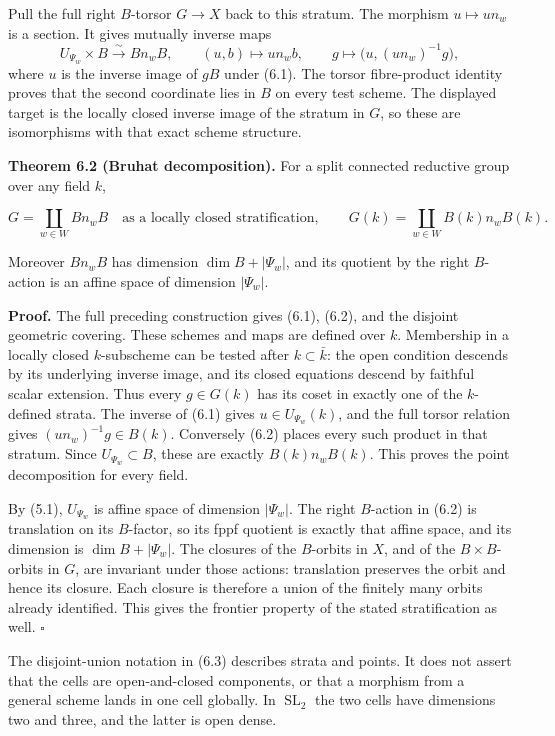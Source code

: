 \documentclass[11pt,a4paper,openany]{report}
\begin{document}
Pull the full right \(B\)-torsor \(G\to X\) back to this stratum. The morphism \(u\mapsto un_w\) is a section. It gives mutually inverse maps \[
 U_{\Psi_w}\times B\xrightarrow{\sim}Bn_wB,\qquad
 (u,b)\longmapsto un_wb,\qquad
 g\longmapsto\bigl(u,(un_w)^{-1}g\bigr),
\tag{6.2}
\] where \(u\) is the inverse image of \(gB\) under (6.1). The torsor fibre-product identity proves that the second coordinate lies in \(B\) on every test scheme. The displayed target is the locally closed inverse image of the stratum in \(G\), so these are isomorphisms with that exact scheme structure.

\textbf{Theorem 6.2 (Bruhat decomposition).} For a split connected reductive group over any field \(k\),

\[
G=\coprod_{w\in W}Bn_wB
\quad\text{as a locally closed stratification},
\qquad
G(k)=\coprod_{w\in W}B(k)n_wB(k).
\tag{6.3}
\]

Moreover \(Bn_wB\) has dimension \(\dim B+|\Psi_w|\), and its quotient by the right \(B\)-action is an affine space of dimension \(|\Psi_w|\).

\textbf{Proof.} The full preceding construction gives (6.1), (6.2), and the disjoint geometric covering. These schemes and maps are defined over \(k\). Membership in a locally closed \(k\)-subscheme can be tested after \(k\subset\bar k\): the open condition descends by its underlying inverse image, and its closed equations descend by faithful scalar extension. Thus every \(g\in G(k)\) has its coset in exactly one of the \(k\)-defined strata. The inverse of (6.1) gives \(u\in U_{\Psi_w}(k)\), and the full torsor relation gives \((un_w)^{-1}g\in B(k)\). Conversely (6.2) places every such product in that stratum. Since \(U_{\Psi_w}\subset B\), these are exactly \(B(k)n_wB(k)\). This proves the point decomposition for every field.

By (5.1), \(U_{\Psi_w}\) is affine space of dimension \(|\Psi_w|\). The right \(B\)-action in (6.2) is translation on its \(B\)-factor, so its fppf quotient is exactly that affine space, and its dimension is \(\dim B+|\Psi_w|\). The closures of the \(B\)-orbits in \(X\), and of the \(B\times B\)-orbits in \(G\), are invariant under those actions: translation preserves the orbit and hence its closure. Each closure is therefore a union of the finitely many orbits already identified. This gives the frontier property of the stated stratification as well. \(\square\)

The disjoint-union notation in (6.3) describes strata and points. It does not assert that the cells are open-and-closed components, or that a morphism from a general scheme lands in one cell globally. In \(\operatorname{SL}_2\) the two cells have dimensions two and three, and the latter is open dense.
\end{document}
